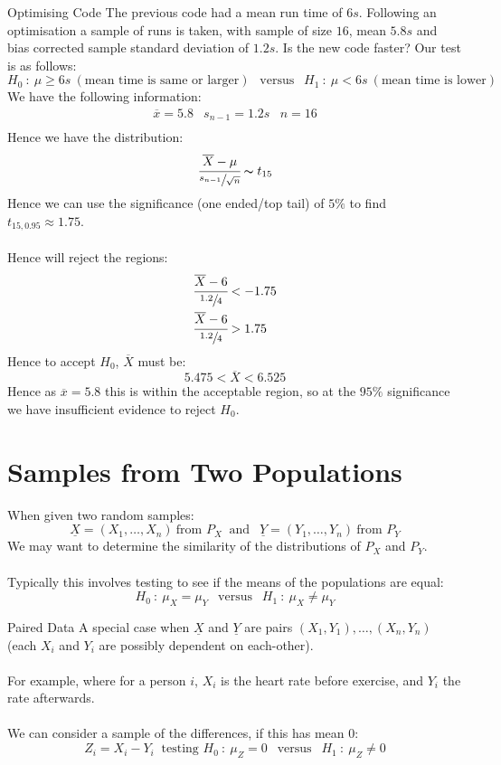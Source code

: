 \begin{examplebox}{Optimising Code}
	The previous code had a mean run time of $6s$. Following an optimisation a sample of runs is taken, with sample of size $16$, mean $5.8s$ and bias corrected sample standard deviation of $1.2s$. Is the new code faster?
	\tcblower
    Our test is as follows:
	\[H_0 \ : \ \mu \geq 6s \ (\text{mean time is same or larger}) \ \ \text{  versus  } \ \ H_1 \ : \ \mu < 6s \ (\text{mean time is lower})\]
	We have the following information:
	\[\begin{matrix}
			\overline{x} = 5.8 & s_{n-1} = 1.2s & n = 16 \\
		\end{matrix}\]
	Hence we have the distribution:
	\[\cfrac{\overline{X} - \mu}{\sfrac{s_{n-1}}{\sqrt{n}}} \thicksim t_{15}\]
	Hence we can use the significance (one ended/top tail) of $5\%$ to find $t_{15, 0.95} \approx 1.75$.
	\\
	\\ Hence will reject the regions:
	\[\begin{split}
			\cfrac{\overline{X} - 6}{\sfrac{1.2}{4}} & < -1.75 \\
			\cfrac{\overline{X} - 6}{\sfrac{1.2}{4}} & > 1.75 \\
		\end{split}\]
	Hence to accept $H_0$, $\overline{X}$ must be:
	\[5.475 < \overline{X} < 6.525\]
	Hence as $\overline{x} = 5.8$ this is within the acceptable region, so at the $95\%$ significance we have insufficient evidence to reject $H_0$.
\end{examplebox}
\section{Samples from Two Populations}
When given two random samples:
\[\underline{X} = (X_1, \dots, X_n) \ \text{from }P_X \ \text{   and   } \ \ \underline{Y} = (Y_1, \dots, Y_n) \ \text{from } P_Y\]
We may want to determine the similarity of the distributions of $P_X$ and $P_Y$.
\\
\\ Typically this involves testing to see if the means of the populations are equal:
\[H_0 \ : \ \mu_X = \mu_Y \ \ \text{  versus  } \ \ H_1 \ : \ \mu_X \neq \mu_Y\]
\begin{definitionbox}{Paired Data}
	A special case when $\underline{X}$ and $\underline{Y}$ are pairs $(X_1, Y_1), \dots, (X_n, Y_n)$ (each $X_i$ and $Y_i$ are possibly dependent on each-other).
	\\
	\\ For example, where for a person $i$, $X_i$ is the heart rate before exercise, and $Y_i$ the rate afterwards.
	\\
	\\ We can consider a sample of the differences, if this has mean $0$:
	\[Z_i = X_i - Y_i \ \text{  testing  } H_0 \ : \ \mu_Z = 0 \ \ \text{  versus  } \ \ H_1 \ : \ \mu_Z \neq 0\]
\end{definitionbox}

